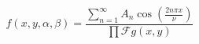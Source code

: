 \begin{equation}
	f(x, y, \alpha, \beta) = \frac{\sum\limits_{n=1}^{\infty}A_n\cos\left(\frac{2n\pi x}{\nu}\right)}{\prod \mathcal{F} g(x, y)}
\end{equation}